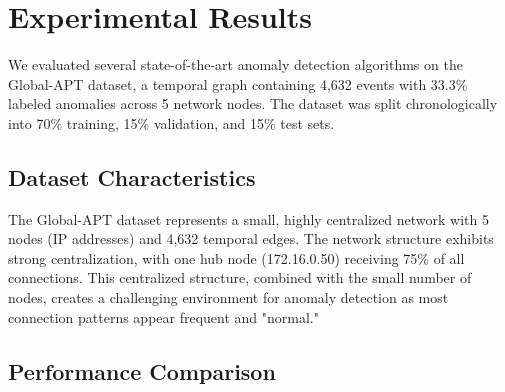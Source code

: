 

\section{Experimental Results}
\label{sec:results}

We evaluated several state-of-the-art anomaly detection algorithms on the Global-APT dataset, a temporal graph containing 4,632 events with 33.3\% labeled anomalies across 5 network nodes. The dataset was split chronologically into 70\% training, 15\% validation, and 15\% test sets.

\subsection{Dataset Characteristics}
\label{subsec:dataset}

The Global-APT dataset represents a small, highly centralized network with 5 nodes (IP addresses) and 4,632 temporal edges. The network structure exhibits strong centralization, with one hub node (172.16.0.50) receiving 75\% of all connections. This centralized structure, combined with the small number of nodes, creates a challenging environment for anomaly detection as most connection patterns appear frequent and "normal."

\subsection{Performance Comparison}
\label{subsec:performance}

